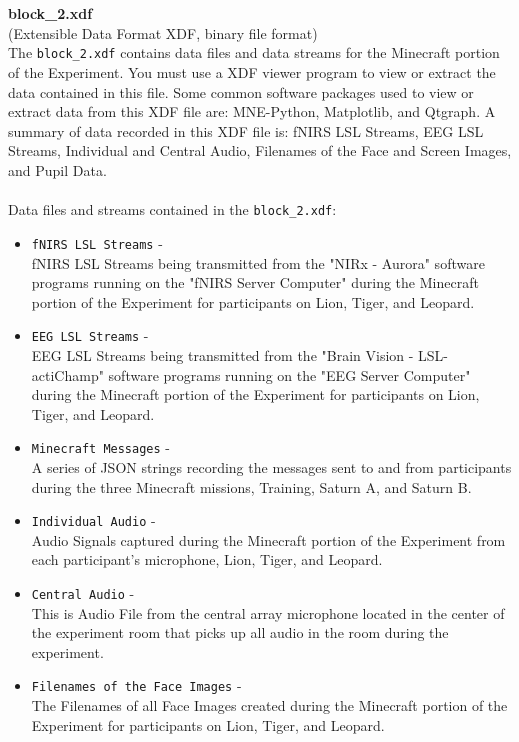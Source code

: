 \begin{description}
\begin{addmargin}[0em]{0em}
    \textbf{\\\\}
    \textbf{block\_2.xdf}\\(Extensible Data Format XDF, binary file format)\\
    The \verb|block_2.xdf| contains data files and data streams for the Minecraft portion of the Experiment.
    You must use a XDF viewer program to view or extract the data contained in this file.
    Some common software packages used to view or extract data from this XDF file are: MNE-Python, Matplotlib, and Qtgraph.
    A summary of data recorded in this XDF file is: fNIRS LSL Streams, EEG LSL Streams, Individual and Central Audio,
    Filenames of the Face and Screen Images, and Pupil Data.\\\\
    Data files and streams contained in the \verb|block_2.xdf|:
    \begin{itemize}
        \item \verb|fNIRS LSL Streams| -\\fNIRS LSL Streams being transmitted from the "NIRx - Aurora" software programs running on the "fNIRS Server Computer" during the Minecraft portion of the Experiment for participants on Lion, Tiger, and Leopard.
        \item \verb|EEG LSL Streams| -\\EEG LSL Streams being transmitted from the "Brain Vision - LSL-actiChamp" software programs running on the "EEG Server Computer" during the Minecraft portion of the Experiment for participants on Lion, Tiger, and Leopard.
        \item \verb|Minecraft Messages| -\\A series of JSON strings recording the messages sent to and from participants during the three Minecraft missions, Training, Saturn A, and Saturn B.
        \item \verb|Individual Audio| -\\Audio Signals captured during the Minecraft portion of the Experiment from each participant's microphone, Lion, Tiger, and Leopard.
        \item \verb|Central Audio| -\\This is Audio File from the central array microphone located in the center of the experiment room that picks up all audio in the room during the experiment.
        \item \verb|Filenames of the Face Images| -\\The Filenames of all Face Images created during the Minecraft portion of the Experiment for participants on Lion, Tiger, and Leopard.

\end{itemize}
\end{addmargin}
\end{description}
